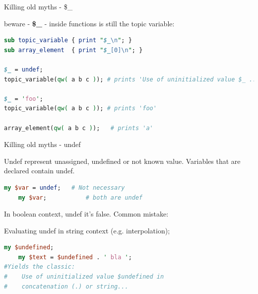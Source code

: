 \documentclass[10pt]{beamer}
\begin{document}
\begin{frame}[fragile]{Killing old myths - \$\_}

beware - \textbf{\$\_ } - inside functions is still the topic variable:

\begin{lstlisting}[language=perl]
sub topic_variable { print "$_\n"; }
sub array_element  { print "$_[0]\n"; }

$_ = undef;
topic_variable(qw( a b c )); # prints 'Use of uninitialized value $_ ...'

$_ = 'foo';
topic_variable(qw( a b c )); # prints 'foo'

array_element(qw( a b c ));   # prints 'a'

\end{lstlisting}

\end{frame}


\begin{frame}[fragile]{Killing old myths - undef}

Undef represent unassigned, undefined or not known value. Variables that are declared contain undef.

\begin{lstlisting}[language=perl]
    my $var = undef;   # Not necessary
    my $var;           # both are undef
\end{lstlisting}

In boolean context, undef it's false. Common mistake:

Evaluating undef in string context (e.g. interpolation);
\begin{lstlisting}[language=perl]
    my $undefined;
    my $text = $undefined . ' bla ';
#Yields the classic:
#    Use of uninitialized value $undefined in
#    concatenation (.) or string...
\end{lstlisting}

\end{frame}


\end{document}
